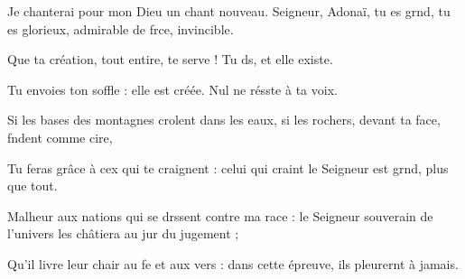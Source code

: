\item Je chanterai pour mon Dieu un chant nouveau.\pscross{} Seigneur, Adonaï, tu es grnd, tu es glorieux,\psstar{} admirable de frce, invincible.
\item Que ta création, tout entire, te serve !\psstar{} Tu ds, et elle existe.
\item Tu envoies ton soffle : elle est créée.\psstar{} Nul ne résste à ta voix.
\item Si les bases des montagnes crolent dans les eaux,\psstar{} si les rochers, devant ta face, fndent comme cire,
\item Tu feras grâce à cex qui te craignent :\psstar{} celui qui craint le Seigneur est grnd, plus que tout.
\item Malheur aux nations qui se drssent contre ma race :\psstar{} le Seigneur souverain de l'univers les châtiera au jur du jugement ;
\item Qu'il livre leur chair au fe et aux vers :\psstar{} dans cette épreuve, ils pleurernt à jamais.